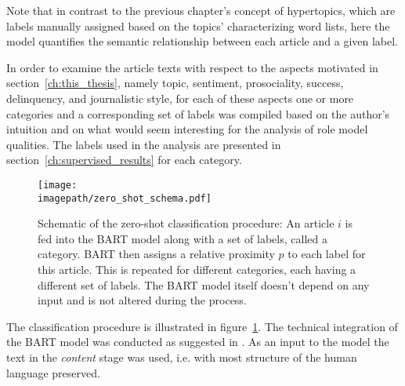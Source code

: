 Note that in contrast to the previous chapter's concept of hypertopics, which are labels manually assigned based on the topics' characterizing word lists, here the model quantifies the semantic relationship between each article and a given label.

In order to examine the article texts with respect to the aspects motivated in section~\ref{ch:this_thesis}, namely topic, sentiment, prosociality, success, delinquency, and journalistic style, for each of these aspects one or more categories and a corresponding set of labels was compiled based on the author's intuition and on what would seem interesting for the analysis of role model qualities. The labels used in the analysis are presented in section~\ref{ch:supervised_results} for each category.

\begin{figure}
    \centering
    \texttt{[image: \\imagepath/zero\_shot\_schema.pdf]}
    \caption{Schematic of the zero-shot classification procedure: An article $i$ is fed into the BART model along with a set of labels, called a category. BART then assigns a relative proximity $p$ to each label for this article. This is repeated for different categories, each having a different set of labels. The BART model itself doesn't depend on any input and is not altered during the process.}\label{fig:zero_shot_schema}
\end{figure}

The classification procedure is illustrated in figure~\ref{fig:zero_shot_schema}. The technical integration of the BART model was conducted as suggested in \textcite{huggingfacebart-large-mnli_facebookbart-large-mnli_nodate}. As an input to the model the text in the \textit{content} stage was used, i.e. with most structure of the human language preserved.

